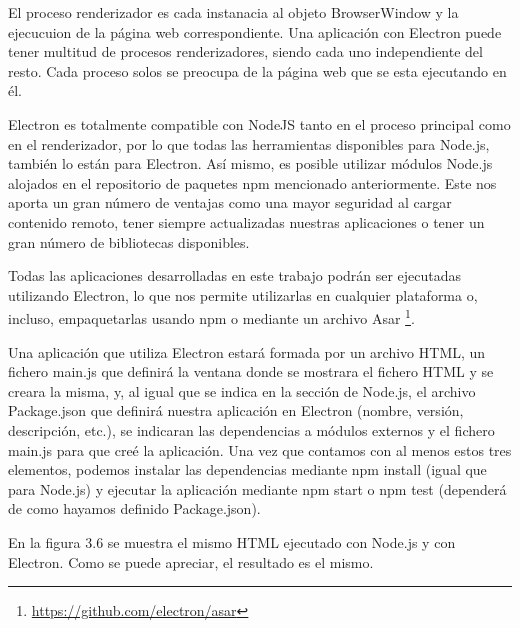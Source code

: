 El proceso renderizador es cada instanacia al objeto BrowserWindow y la ejecucuion de la página web correspondiente. Una aplicación con Electron puede tener multitud de procesos renderizadores, siendo cada uno independiente del resto. Cada proceso solos se preocupa de la página web que se esta ejecutando en él.

Electron es totalmente compatible con NodeJS tanto en el proceso principal como en el renderizador, por lo que todas las herramientas disponibles para Node.js, también lo están para Electron. Así mismo, es posible utilizar módulos Node.js alojados en el repositorio de paquetes npm mencionado anteriormente. Este nos aporta un gran número de ventajas como una mayor seguridad al cargar contenido remoto, tener siempre actualizadas nuestras aplicaciones o tener un gran número de bibliotecas disponibles.

Todas las aplicaciones desarrolladas en este trabajo podrán ser ejecutadas utilizando Electron, lo que nos permite utilizarlas en cualquier plataforma o, incluso, empaquetarlas usando npm o mediante un archivo Asar \footnote{\url{https://github.com/electron/asar}}.

Una aplicación que utiliza Electron estará formada por un archivo HTML, un fichero main.js que definirá la ventana donde se mostrara el fichero HTML y se creara la misma, y, al igual que se indica en la sección de Node.js, el archivo Package.json que definirá nuestra aplicación en Electron (nombre, versión, descripción, etc.), se indicaran las dependencias a módulos externos y el fichero main.js para que creé la aplicación. Una vez que contamos con al menos estos tres elementos, podemos instalar las dependencias mediante npm install (igual que para Node.js) y ejecutar la aplicación mediante npm start o npm test (dependerá de como hayamos definido Package.json).

En la figura 3.6 se muestra el mismo HTML ejecutado con Node.js y con Electron. Como se puede apreciar, el resultado es el mismo.

